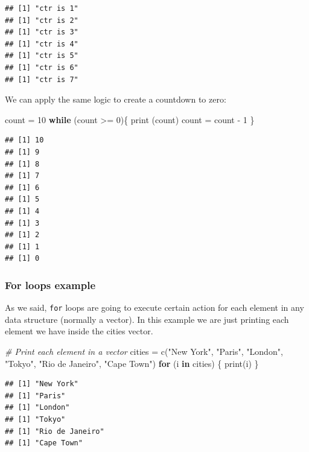 \documentclass[
]{book}
\newenvironment{Shaded}{\begin{snugshade}}{\end{snugshade}}
\newcommand{\CommentTok}[1]{\textcolor[rgb]{0.56,0.35,0.01}{\textit{#1}}}
\newcommand{\ControlFlowTok}[1]{\textcolor[rgb]{0.13,0.29,0.53}{\textbf{#1}}}
\newcommand{\DecValTok}[1]{\textcolor[rgb]{0.00,0.00,0.81}{#1}}
\newcommand{\FunctionTok}[1]{\textcolor[rgb]{0.00,0.00,0.00}{#1}}
\newcommand{\NormalTok}[1]{#1}
\newcommand{\OtherTok}[1]{\textcolor[rgb]{0.56,0.35,0.01}{#1}}
\newcommand{\SpecialCharTok}[1]{\textcolor[rgb]{0.00,0.00,0.00}{#1}}
\newcommand{\StringTok}[1]{\textcolor[rgb]{0.31,0.60,0.02}{#1}}
\theoremstyle{definition}
\theoremstyle{definition}
\theoremstyle{definition}
\theoremstyle{definition}
\theoremstyle{remark}
\begin{document}
\begin{verbatim}
## [1] "ctr is 1"
## [1] "ctr is 2"
## [1] "ctr is 3"
## [1] "ctr is 4"
## [1] "ctr is 5"
## [1] "ctr is 6"
## [1] "ctr is 7"
\end{verbatim}

We can apply the same logic to create a countdown to zero:

\begin{Shaded}
\begin{Highlighting}[]
\NormalTok{count }\OtherTok{=} \DecValTok{10}
\ControlFlowTok{while}\NormalTok{ (count }\SpecialCharTok{\textgreater{}=} \DecValTok{0}\NormalTok{)\{}
    \FunctionTok{print}\NormalTok{ (count)}
\NormalTok{    count }\OtherTok{=}\NormalTok{ count }\SpecialCharTok{{-}} \DecValTok{1}
\NormalTok{\}}
\end{Highlighting}
\end{Shaded}

\begin{verbatim}
## [1] 10
## [1] 9
## [1] 8
## [1] 7
## [1] 6
## [1] 5
## [1] 4
## [1] 3
## [1] 2
## [1] 1
## [1] 0
\end{verbatim}

\hypertarget{for-loops-example}{%
\subsubsection{For loops example}\label{for-loops-example}}

As we said, \texttt{for} loops are going to execute certain action for each element in any data structure (normally a vector). In this example we are just printing each element we have inside the cities vector.

\begin{Shaded}
\begin{Highlighting}[]
\CommentTok{\# Print each element in a vector}
\NormalTok{cities }\OtherTok{=} \FunctionTok{c}\NormalTok{(}\StringTok{"New York"}\NormalTok{, }\StringTok{"Paris"}\NormalTok{, }\StringTok{"London"}\NormalTok{, }\StringTok{"Tokyo"}\NormalTok{, }\StringTok{"Rio de Janeiro"}\NormalTok{, }\StringTok{"Cape Town"}\NormalTok{)}
\ControlFlowTok{for}\NormalTok{ (i }\ControlFlowTok{in}\NormalTok{ cities) \{}
  \FunctionTok{print}\NormalTok{(i)}
\NormalTok{\}}
\end{Highlighting}
\end{Shaded}

\begin{verbatim}
## [1] "New York"
## [1] "Paris"
## [1] "London"
## [1] "Tokyo"
## [1] "Rio de Janeiro"
## [1] "Cape Town"
\end{verbatim}
\end{document}

